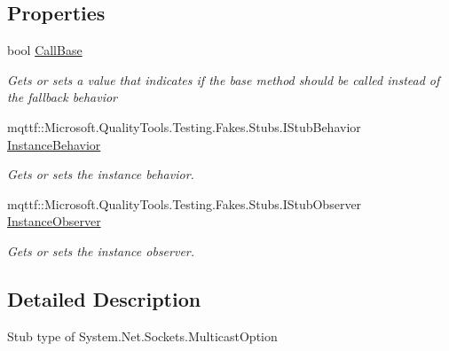 \subsection*{Properties}
\begin{DoxyCompactItemize}
\item 
bool \hyperlink{class_system_1_1_net_1_1_sockets_1_1_fakes_1_1_stub_multicast_option_a517b95e9a98f897df88b5763fabdb0ed}{Call\-Base}
\begin{DoxyCompactList}\small\item\em Gets or sets a value that indicates if the base method should be called instead of the fallback behavior\end{DoxyCompactList}\item 
mqttf\-::\-Microsoft.\-Quality\-Tools.\-Testing.\-Fakes.\-Stubs.\-I\-Stub\-Behavior \hyperlink{class_system_1_1_net_1_1_sockets_1_1_fakes_1_1_stub_multicast_option_a41f4ba56c4be80d2ff99d3b31a37048d}{Instance\-Behavior}
\begin{DoxyCompactList}\small\item\em Gets or sets the instance behavior.\end{DoxyCompactList}\item 
mqttf\-::\-Microsoft.\-Quality\-Tools.\-Testing.\-Fakes.\-Stubs.\-I\-Stub\-Observer \hyperlink{class_system_1_1_net_1_1_sockets_1_1_fakes_1_1_stub_multicast_option_aacb48ce48acdff89276bf289ea60b532}{Instance\-Observer}
\begin{DoxyCompactList}\small\item\em Gets or sets the instance observer.\end{DoxyCompactList}\end{DoxyCompactItemize}


\subsection{Detailed Description}
Stub type of System.\-Net.\-Sockets.\-Multicast\-Option



